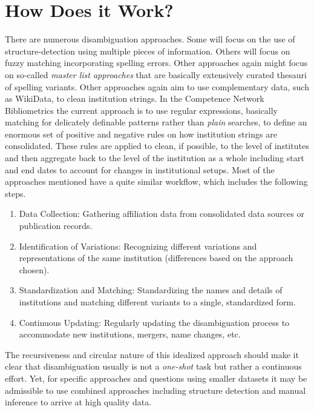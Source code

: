 \documentclass[
  letterpaper,
]{scrreprt}
\providecommand{\tightlist}{%
  \setlength{\itemsep}{0pt}\setlength{\parskip}{0pt}}
\begin{document}
\section{How Does it Work?}\label{how-does-it-work-2}

There are numerous disambiguation approaches. Some will focus on the use
of structure-detection using multiple pieces of information. Others will
focus on fuzzy matching incorporating spelling errors. Other approaches
again might focus on so-called \emph{master list approaches} that are
basically extensively curated thesauri of spelling variants. Other
approaches again aim to use complementary data, such as WikiData, to
clean institution strings. In the Competence Network Bibliometrics the
current approach is to use regular expressions, basically matching for
delicately definable patterns rather than \emph{plain} searches, to
define an enormous set of positive and negative rules on how institution
strings are consolidated. These rules are applied to clean, if possible,
to the level of institutes and then aggregate back to the level of the
institution as a whole including start and end dates to account for
changes in institutional setups. Most of the approaches mentioned have a
quite similar workflow, which includes the following steps.

\begin{enumerate}
\def\labelenumi{\arabic{enumi}.}
\tightlist
\item
  Data Collection: Gathering affiliation data from consolidated data
  sources or publication records.
\item
  Identification of Variations: Recognizing different variations and
  representations of the same institution (differences based on the
  approach chosen).
\item
  Standardization and Matching: Standardizing the names and details of
  institutions and matching different variants to a single, standardized
  form.
\item
  Continuous Updating: Regularly updating the disambiguation process to
  accommodate new institutions, mergers, name changes, etc.
\end{enumerate}

The recursiveness and circular nature of this idealized approach should
make it clear that disambiguation usually is not a \emph{one-shot} task
but rather a continuous effort. Yet, for specific approaches and
questions using smaller datasets it may be admissible to use combined
approaches including structure detection and manual inference to arrive
at high quality data.
\end{document}
